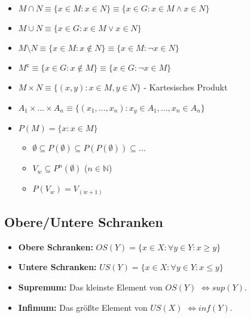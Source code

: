 \documentclass[12pt]{scrreprt}
\begin{document}
                \begin{itemize}
                    \item $ M \cap N \equiv \{ x \in M : x \in N \} \equiv \{ x \in G : x \in M \land x \in N \} $
                    \item $ M \cup N \equiv \{ x \in G : x \in M \lor x \in N \} $
                    \item $ M \setminus N \equiv \{ x \in M : x \not\in N \} \equiv \{ x \in M : \lnot x \in N \} $
                    \item $ M ^ \mathsf{c} \equiv \{ x \in G : x \not\in M \} \equiv \{ x \in G : \lnot x \in M \} $
                    \item $ M \times N \equiv \{ (x, y) : x \in M , y \in N \} $ - Kartesisches Produkt
                    \item $ A _ 1 \times ... \times A _ n \equiv \{ (x _ 1, ..., x _ n) : x _ y \in A _ 1, ..., x _ n \in A _ n \} $
                    \item $ P(M) = \{ x : x \in M \} $
                    \begin{itemize}
                        \item $ \emptyset \subseteq P(\emptyset) \subseteq P(P(\emptyset)) \subseteq ... $
                        \item $ V _ w \subseteq P ^ n (\emptyset) $ ($ n \in \mathbb{N} $)
                        \item $ P(V _ w) = V _ (w + 1) $
                    \end{itemize}
                \end{itemize}


            \subsection{Obere/Untere Schranken}
                \begin{itemize}
                    \item \textbf{Obere Schranken:} $ OS(Y) = \{ x \in X : \forall y \in Y : x \geq y \} $
                    \item \textbf{Untere Schranken:} $ US(Y) = \{ x \in X : \forall y \in Y : x \leq y \} $
                \end{itemize}

                \begin{itemize}
                    \item \textbf{Supremum:} Das kleinste Element von $ OS(Y) $ $ \iff sup(Y) $.
                    \item \textbf{Infimum:} Das größte Element von $ US(X) $ $ \iff inf(Y) $.
                \end{itemize}
\end{document}
